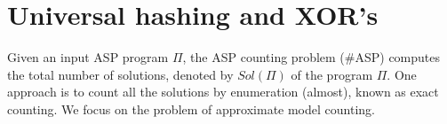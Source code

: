 \documentclass{article}
\def\asp{\textsf{\#ASP}\xspace}
\newcommand{\XOR}{\textsc{xor}} %
\newcommand{\fff}{\ensuremath{\Pi}\xspace}
\newcommand{\sol}{$Sol(\Pi)$\xspace}
\newcommand{\sysfont}{\textit}
\newcommand{\xorro}{\sysfont{xorro}}
\begin{document}




%

\section{Universal hashing and XOR's} \label{sec:hashing}
Given an input ASP program \fff, the ASP counting problem (\asp) computes the total number of solutions, denoted by \sol of the program \fff.
%
One approach is to count all the solutions by enumeration (almost), known as exact counting.
%
We focus on the problem of approximate model counting. 
%
%
\end{document}
